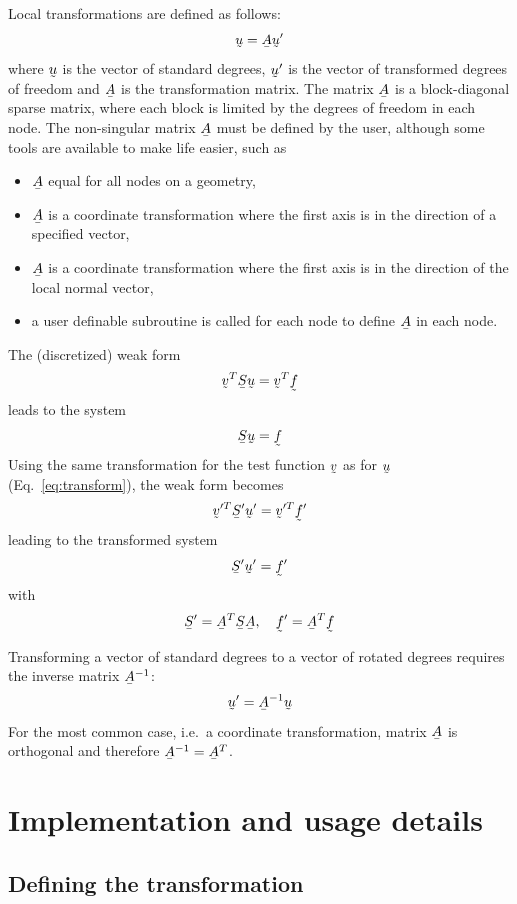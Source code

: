 Local transformations are defined as follows:
\begin{equation}
    \col u = \mat A \col u'
   \label{eq:transform}
\end{equation}
where $\col u$ is the vector of standard degrees, $\col u'$
is the vector of transformed degrees of freedom and $\mat A$ is the
transformation matrix. The matrix $\mat A$ is a block-diagonal sparse matrix,
where each block is limited by the degrees of freedom in each node. The
non-singular matrix $\mat A$ must be defined by the user, although some tools
are available to make life easier, such as
\begin{itemize}
   \item $\mat A$ equal for all nodes on a geometry,
   \item $\mat A$ is a coordinate transformation where the first axis is in the direction of a
                  specified vector,
   \item $\mat A$ is a coordinate transformation where the first axis is in the direction of the
                  local normal vector,
   \item a user definable subroutine is called for each node to define $\mat A$
in each node.
\end{itemize}
The (discretized) weak form 
\[
     \col v^T \mat S \col u = \col v^T \col f
\]
leads to the system 
\[
   \mat S \col u = \col f
\]
Using the same transformation for the test function $\col v$ as for
$\col u$ (Eq.~\eqref{eq:transform}), the weak form becomes
\[
     \col v'^T \mat S' \col u' = \col v'^T \col f'
\]
leading to the transformed system 
\[
   \mat S' \col u' = \col f'
\]
with
\[
   \mat S'=\mat A^T\mat S\mat A, \quad \col f'=\mat A^T \col f
\]

Transforming a vector of standard degrees to a vector of rotated degrees
requires the inverse matrix $\mat A^{-1}$:
\begin{equation}
    \col u' = \mat A^{-1} \col u
\end{equation}
For the most common case, i.e.\ a coordinate transformation, matrix
$\mat A$ is orthogonal and therefore $\mat A^{-1}=\mat A^T$. 

\section{Implementation and usage details}

\subsection{Defining the transformation}

